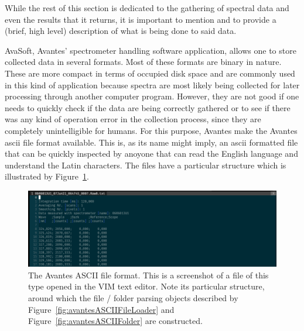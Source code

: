 While the rest of this section is dedicated to the gathering of spectral
data and even the results that it returns, it is important to mention
and to provide a (brief, high level) description of what is being done
to said data.

AvaSoft, Avantes' spectrometer handling software application, allows one
to store collected data in several formats. Most of these formats are
binary in nature. These are more compact in terms of occupied disk space
and are commonly used in this kind of application because spectra are
most likely being collected for later processing through another
computer program. However, they are not good if one needs to quickly
check if the data are being correctly gathered or to see if there was
any kind of operation error in the collection process, since they are
completely unintelligible for humans. For this purpose, Avantes make the
Avantes \gls{ascii} file format available. This is, as its name might
imply, an \gls{ascii} formatted file that can be quickly inspected by
anoyone that can read the English language and understand the Latin
characters. The files have a particular structure which is illustrated
by Figure~\ref{fig:avantesASCIIFile}.

\begin{figure}[htpb]
    \centering
    \includegraphics[width=\linewidth]{img/png/avantes_ascii.png}
    \caption{The Avantes ASCII file format. This is a screenshot of a
        file of this type opened in the VIM text editor. Note its
        particular structure, around which the file / folder parsing
        objects described by Figure~\ref{fig:avantesASCIIFileLoader} and
        Figure~\ref{fig:avantesASCIIFolder} are constructed.}
        \label{fig:avantesASCIIFile}
\end{figure}

